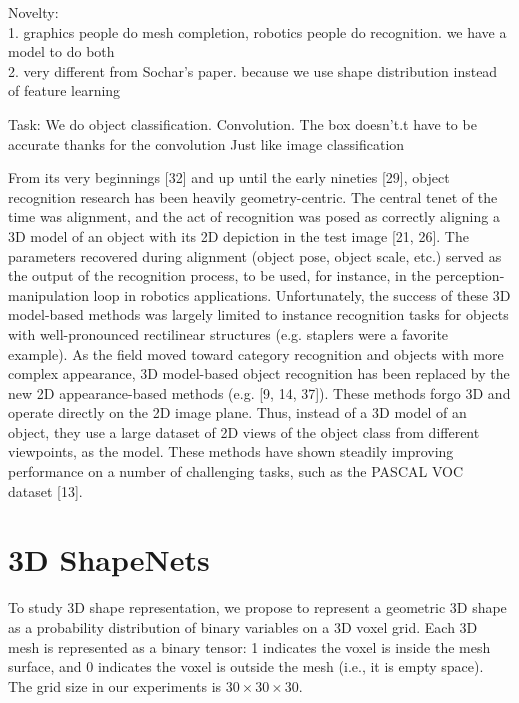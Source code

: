 \documentclass[10pt,twocolumn,letterpaper]{article}
\begin{document}
Novelty:\\
1. graphics people do mesh completion, robotics people do recognition. we have a model to do both\\
2. very different from Sochar’s paper. because we use shape distribution instead of feature learning

Task:
We do object classification.
Convolution. The box doesn't.t have to be accurate thanks for the convolution
Just like image classification

From its very beginnings [32] and up until the early
nineties [29], object recognition research has been heavily
geometry-centric. The central tenet of the time was alignment,
and the act of recognition was posed as correctly
aligning a 3D model of an object with its 2D depiction in
the test image [21, 26]. The parameters recovered during
alignment (object pose, object scale, etc.) served as the output
of the recognition process, to be used, for instance, in
the perception-manipulation loop in robotics applications.
Unfortunately, the success of these 3D model-based methods
was largely limited to instance recognition tasks for
objects with well-pronounced rectilinear structures (e.g. staplers were a favorite example). As the field moved toward
category recognition and objects with more complex appearance,
3D model-based object recognition has been replaced
by the new 2D appearance-based methods (e.g. [9, 14, 37]).
These methods forgo 3D and operate directly on the 2D image
plane. Thus, instead of a 3D model of an object, they
use a large dataset of 2D views of the object class from different
viewpoints, as the model. These methods have shown
steadily improving performance on a number of challenging
tasks, such as the PASCAL VOC dataset [13].

\fi




\section{3D ShapeNets} 

To study 3D shape representation,
we propose to represent a geometric 3D shape as a probability distribution of binary variables on a 3D voxel grid.
Each 3D mesh is represented as a binary tensor: 1 indicates the voxel is inside the mesh surface, and 0 indicates the voxel is outside the mesh (i.e., it is empty space).
The grid size in our experiments is $30\times30\times30$. 
\end{document}
